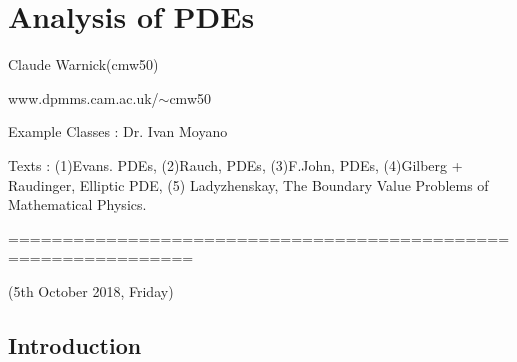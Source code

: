 \documentclass[10pt,a4paper]{report}
\DeclarePairedDelimiter\bignorm{\lVert}{\rVert}
\begin{document}
\newcommand{\thm}{\textbf{Theorem) }}
\newcommand{\thmnum}[1]{\textbf{Theorem #1) }}
\newcommand{\defi}{\textbf{Definition) }}
\newcommand{\definum}[1]{\textbf{Definition #1) }}
\newcommand{\lem}{\textbf{Lemma) }}
\newcommand{\lemnum}[1]{\textbf{Lemma #1) }}
\newcommand{\prop}{\textbf{Proposition) }}
\newcommand{\propnum}[1]{\textbf{Proposition #1) }}
\newcommand{\corr}{\textbf{Corollary) }}
\newcommand{\corrnum}[1]{\textbf{Corollary #1) }}
\newcommand{\pf}{\textbf{proof) }}

\newcommand{\lap}{\triangle} %
\newcommand{\s}{\vspace{10pt}}
\newcommand{\bull}{$\bullet$}
\newcommand{\sta}{$\star$}
\newcommand{\reals}{\mathbb{R}}

\newcommand{\eop}{\hfill  \textsl{(End of proof)} $\square$} %
\newcommand{\eos}{\hfill  \textsl{(End of statement)} $\square$} %


\newcommand{\intN}{\mathbb{Z}_N}
\newcommand{\nat}{\mathbb{N}}
\newcommand{\norms}[2]{\bignorm[\big]{#1}_{#2}}
\newcommand{\abs}[1]{\big| #1 \big|}
\newcommand{\avg}{\mathbb{E}}
\newcommand{\prob}{\mathbb{P}}
\newcommand{\borel}{\mathscr{B}}
\newcommand{\EE}{\mathscr{E}}
\newcommand{\pa}{\partial}

\renewcommand{\bar}{\overline}

\def\doubleunderline#1{\underline{\underline{#1}}}

\newcommand{\newday}{===============================================================}
\newcommand{\digression}{**********************************************************************************************}


\setlength\parindent{0pt}

\chapter*{Analysis of PDEs}
\s

Claude Warnick(cmw50)

www.dpmms.cam.ac.uk/$\sim$cmw50

Example Classes : Dr. Ivan Moyano
\s

Texts : (1)Evans. PDEs, (2)Rauch, PDEs, (3)F.John, PDEs, (4)Gilberg + Raudinger, Elliptic PDE, (5) Ladyzhenskay, The Boundary Value Problems of Mathematical Physics.
\s

\newday

(5th October 2018, Friday)
\s

\section*{Introduction}
\end{document}
